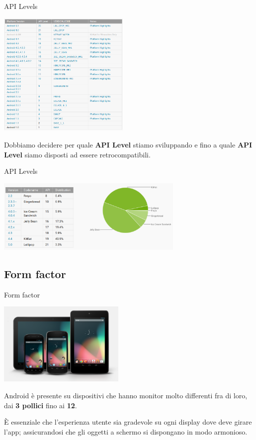 \documentclass[xcolor=svgnames,11pt]{beamer}
\begin{document}
\begin{frame}{API Levels}
\begin{center}
\includegraphics[height=6cm]{apilevel.png}
\end{center}
\pause
Dobbiamo decidere per quale \textbf{API Level} stiamo sviluppando e fino a quale \textbf{API Level} siamo disposti ad essere retrocompatibili.

\end{frame}

\begin{frame}{API Levels}

\begin{center}
\includegraphics[width=9cm]{dashboard.png}
\end{center}
\end{frame}


\subsection{Form factor}
\begin{frame}{Form factor}

\begin{center}
\includegraphics[height=4cm]{devices.png}
\end{center}

\pause

Android \`e presente su dispositivi che hanno monitor molto differenti fra di loro, dai \textbf{3 pollici} fino ai \textbf{12}.

\pause

\begin{block}{}
\`E essenziale che l'esperienza utente sia gradevole su ogni display dove deve girare l'app; assicurandosi che gli oggetti a schermo si dispongano in modo armonioso.
\end{block}
\end{frame}
\end{document}
